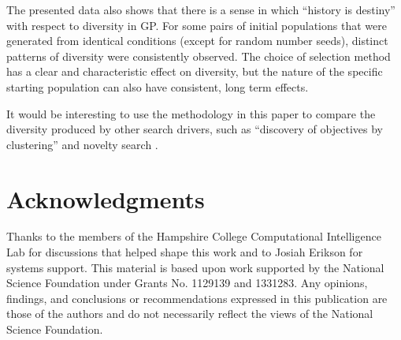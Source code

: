 \documentclass{sig-alternate-05-2015}
\begin{document}
The presented data also shows that there is a sense in which ``history is destiny'' with respect to diversity in GP. For some pairs of initial populations that were generated from identical conditions (except for random number seeds), distinct patterns of diversity were consistently observed. The choice of selection method has a clear and characteristic effect on diversity, but the nature of the specific starting population can also have consistent, long term effects.

It would be interesting to use the methodology in this paper to compare the diversity produced by other search drivers, such as ``discovery of objectives by clustering'' \cite{Krawiec:2015:EuroGP} and novelty search \cite{Lehman:2011:EDV:2001576.2001606}.


\section*{Acknowledgments}
Thanks to the members of the Hampshire College Computational Intelligence Lab for discussions that helped shape this work and to Josiah Erikson for systems support.
This material is based upon work supported by the National Science Foundation under Grants No. 1129139 and 1331283. Any opinions, findings, and conclusions or recommendations expressed in this publication are those of the authors and do not necessarily reflect the views of the National Science Foundation.



%
%


\end{document}
